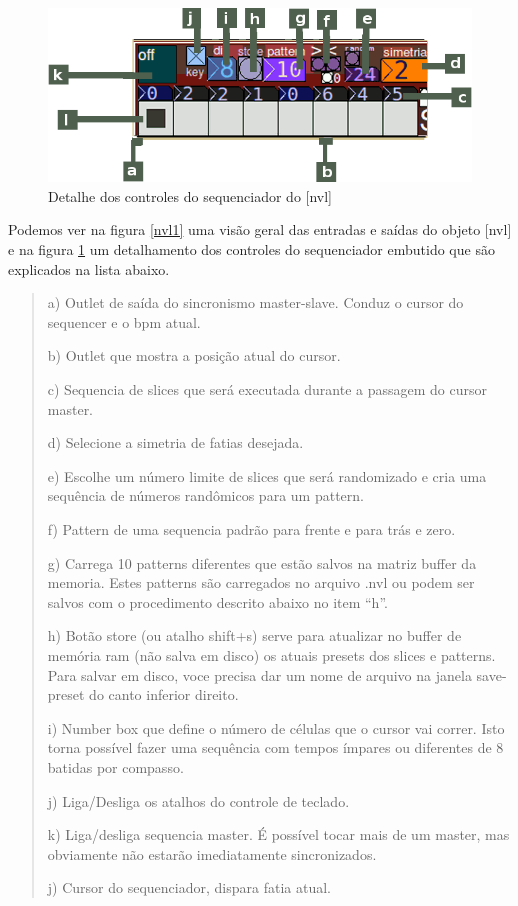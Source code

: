 \documentclass{ppgmus}
\begin{document}
\begin{figure}
\includegraphics[scale=.6]{nvl2}
\caption{Detalhe dos controles do sequenciador do [nvl]}
\label{nvl2}
\end{figure}


Podemos ver na figura \ref{nvl1} uma visão geral das entradas e saídas do objeto [nvl] e na figura
\ref{nvl2} um detalhamento dos controles do sequenciador embutido que são explicados na lista abaixo.

\begin{quote}
\begin{description}
  
\item a) Outlet de saída do sincronismo master-slave. Conduz o cursor do sequencer e o bpm atual.
\item b) Outlet que mostra a posição atual do cursor.
\item c) Sequencia de slices que será executada durante a passagem do cursor master.
\item d) Selecione a simetria de fatias desejada.
\item e) Escolhe um número limite de slices que será randomizado e cria uma sequência de números randômicos para um pattern.
\item f) Pattern de uma sequencia padrão para frente e para trás e zero.
\item g) Carrega 10 patterns diferentes que estão salvos na matriz buffer da memoria. Estes patterns são carregados no arquivo .nvl ou podem ser salvos com o procedimento descrito abaixo no item “h”.
\item h) Botão store (ou atalho shift+s) serve para atualizar no buffer de memória ram (não salva em disco) os atuais presets dos slices e patterns. Para salvar em disco, voce precisa dar um nome de arquivo na janela save-preset do canto inferior direito.
\item i) Number box que define o número de células que o cursor vai correr. Isto torna possível fazer uma sequência com tempos ímpares ou diferentes de 8 batidas por compasso.
\item j) Liga/Desliga os atalhos do controle de teclado.
\item k) Liga/desliga sequencia master. É possível tocar mais de um master, mas obviamente não estarão imediatamente sincronizados.
\item j) Cursor do sequenciador, dispara fatia atual.
\cite{navalha}
\end{description}
\end{quote}
\end{document}

